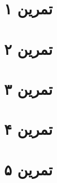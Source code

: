 \documentclass[11pt]{article}
\begin{document}
\section*{تمرین ۱}

\pagebreak
\section*{تمرین ۲}

\pagebreak
\section*{تمرین ۳}

\section*{تمرین ۴}

\pagebreak
\section*{تمرین ۵}

\end{document}
